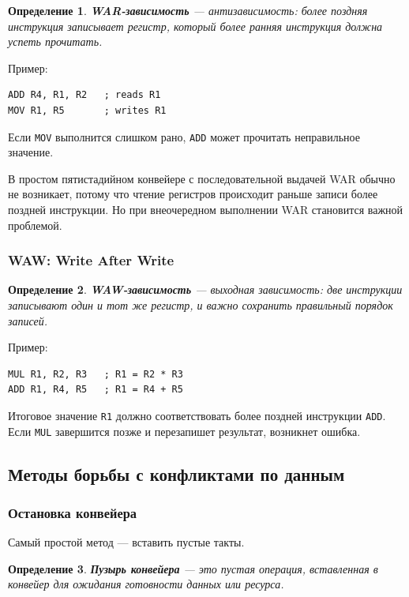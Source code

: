 \documentclass[12pt,a4paper]{article}
\newtheorem{definition}{Определение}
\begin{document}
\begin{definition}
\textbf{WAR-зависимость} --- антизависимость: более поздняя инструкция записывает регистр, который более ранняя инструкция должна успеть прочитать.
\end{definition}

Пример:

\begin{lstlisting}
ADD R4, R1, R2   ; reads R1
MOV R1, R5       ; writes R1
\end{lstlisting}

Если \texttt{MOV} выполнится слишком рано, \texttt{ADD} может прочитать неправильное значение.

В простом пятистадийном конвейере с последовательной выдачей WAR обычно не возникает, потому что чтение регистров происходит раньше записи более поздней инструкции. Но при внеочередном выполнении WAR становится важной проблемой.

\subsubsection{WAW: Write After Write}

\begin{definition}
\textbf{WAW-зависимость} --- выходная зависимость: две инструкции записывают один и тот же регистр, и важно сохранить правильный порядок записей.
\end{definition}

Пример:

\begin{lstlisting}
MUL R1, R2, R3   ; R1 = R2 * R3
ADD R1, R4, R5   ; R1 = R4 + R5
\end{lstlisting}

Итоговое значение \texttt{R1} должно соответствовать более поздней инструкции \texttt{ADD}. Если \texttt{MUL} завершится позже и перезапишет результат, возникнет ошибка.

\subsection{Методы борьбы с конфликтами по данным}

\subsubsection{Остановка конвейера}

Самый простой метод --- вставить пустые такты.

\begin{definition}
\textbf{Пузырь конвейера} --- это пустая операция, вставленная в конвейер для ожидания готовности данных или ресурса.
\end{definition}
\end{document}
